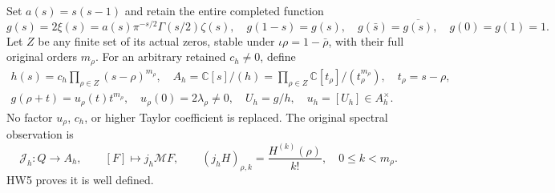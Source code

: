 \documentclass[11pt]{article}
\newcommand{\C}{\mathbb C}
\newcommand{\M}{\mathcal M}
\begin{document}
Set \(a(s)=s(s-1)\) and retain the entire completed function
\[
 g(s)=2\xi(s)=a(s)\pi^{-s/2}\Gamma(s/2)\zeta(s),\quad
 g(1-s)=g(s),\quad g(\bar s)=\overline{g(s)},\quad g(0)=g(1)=1.
 \tag{HW6}
\]
Let \(Z\) be any finite set of its actual zeros, stable under
\(\iota\rho=1-\bar\rho\), with their full original orders \(m_\rho\).
For an arbitrary retained \(c_h\ne0\), define
\[
 \begin{gathered}
 h(s)=c_h\prod_{\rho\in Z}(s-\rho)^{m_\rho},\quad
 A_h=\C[s]/(h)=\prod_{\rho\in Z}\C[t_\rho]/(t_\rho^{m_\rho}),
       \quad t_\rho=s-\rho,\\
 g(\rho+t)=u_\rho(t)t^{m_\rho},\quad
 u_\rho(0)=2\lambda_\rho\ne0,\quad
 U_h=g/h,\quad u_h=[U_h]\in A_h^\times.
 \end{gathered}
 \tag{HW7}\label{hw:packet}
\]
No factor \(u_\rho\), \(c_h\), or higher Taylor coefficient is
replaced. The original spectral observation is
\[
 \mathcal J_h:Q\longrightarrow A_h,\qquad
 [F]\longmapsto j_h\M F,\qquad
 (j_h H)_{\rho,k}=\frac{H^{(k)}(\rho)}{k!},\quad 0\le k<m_\rho .
 \tag{HW8}\label{hw:jetmap}
\]
HW5 proves it is well defined.
\end{document}
